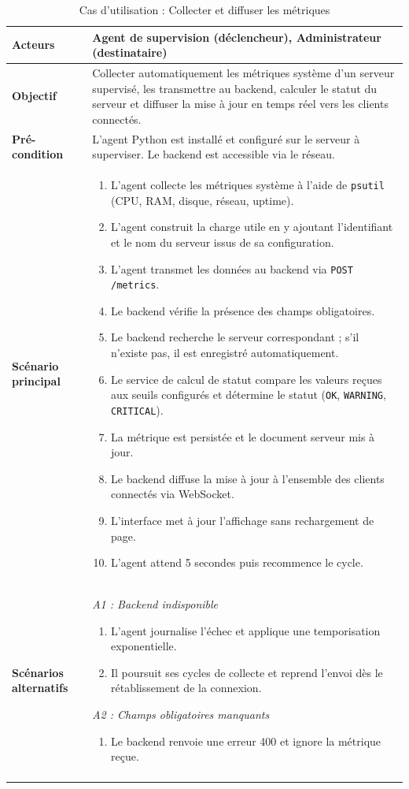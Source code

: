\renewcommand{\arraystretch}{1.4}
\begin{longtable}{|p{3.0cm}|>{\raggedright\arraybackslash}p{11.4cm}|}
\hline
\textbf{Acteurs} & Agent de supervision (déclencheur), Administrateur (destinataire) \\
\hline
\textbf{Objectif} & Collecter automatiquement les métriques système d'un serveur
supervisé, les transmettre au backend, calculer le statut du serveur et diffuser la
mise à jour en temps réel vers les clients connectés. \\
\hline
\textbf{Pré-condition} & L'agent Python est installé et configuré sur le serveur à
superviser. Le backend est accessible via le réseau. \\
\hline
\textbf{Scénario principal} &
\begin{enumerate}[leftmargin=*, nosep]
  \item L'agent collecte les métriques système à l'aide de \texttt{psutil} (CPU, RAM,
        disque, réseau, uptime).
  \item L'agent construit la charge utile en y ajoutant l'identifiant et le nom du
        serveur issus de sa configuration.
  \item L'agent transmet les données au backend via \texttt{POST /metrics}.
  \item Le backend vérifie la présence des champs obligatoires.
  \item Le backend recherche le serveur correspondant ; s'il n'existe pas, il est
        enregistré automatiquement.
  \item Le service de calcul de statut compare les valeurs reçues aux seuils configurés
        et détermine le statut (\texttt{OK}, \texttt{WARNING}, \texttt{CRITICAL}).
  \item La métrique est persistée et le document serveur mis à jour.
  \item Le backend diffuse la mise à jour à l'ensemble des clients connectés via
        WebSocket.
  \item L'interface met à jour l'affichage sans rechargement de page.
  \item L'agent attend 5 secondes puis recommence le cycle.
\end{enumerate} \\
\hline
\textbf{Scénarios alternatifs} &
\textit{A1 : Backend indisponible}
\begin{enumerate}[leftmargin=*, nosep]
  \item L'agent journalise l'échec et applique une temporisation exponentielle.
  \item Il poursuit ses cycles de collecte et reprend l'envoi dès le rétablissement de
        la connexion.
\end{enumerate}
\textit{A2 : Champs obligatoires manquants}
\begin{enumerate}[leftmargin=*, nosep]
  \item Le backend renvoie une erreur 400 et ignore la métrique reçue.
\end{enumerate} \\
\hline
\caption{Cas d'utilisation : Collecter et diffuser les métriques}
\label{tab:cu-collecte}
\end{longtable}

